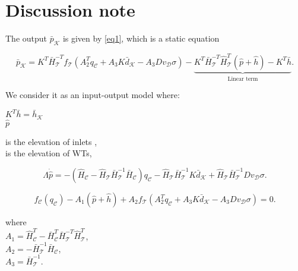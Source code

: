 


\frontmatter
{}

\section{Discussion note}

The output $\bar{p}_{\mathcal{K}}$ is given by \eqref{eq1}, which is a static equation

\begin{equation}
  \label{eq1}
  \bar{p}_{\mathcal{K}} = K^T \bar{H}^{-T}_{\mathcal{T}}f_{\mathcal{T}}(A_2^T q_\mathcal{C} + A_3 K \bar{d}_{\mathcal{K}} - A_3 D v_{\mathcal{D}} \sigma) - \underbrace{K^T\bar{H}^{-T}_{\mathcal{T}}\hat{H}^{T}_{\mathcal{T}} (\hat{p} + \hat{h}) - K^T\bar{h}}_{\text{Linear term}} .
\end{equation}

We consider it as an input-output model where:

 \begin{minipage}[t]{0.28\textwidth}
\hspace*{6mm} $K^T\bar{h} = \bar{h}_{\mathcal{K}} $ \\
\hspace*{6mm} $\hat{p}$  
\end{minipage}
\begin{minipage}[t]{0.68\textwidth}
is the elevation of inlets ,\\
is the elevation of WTs, 
\end{minipage}

\begin{equation}
\label{eq2}
\Lambda \dot{\hat{p}} = - (\hat{H}_{\mathcal{C}} - \hat{H}_{\mathcal{T}} \bar{H}^{-1}_{\mathcal{T}}\bar{H}_{\mathcal{C}})  q_\mathcal{C}  - \hat{H}_{\mathcal{T}} \bar{H}^{-1}_{\mathcal{T}} K \bar{d}_{\mathcal{K}} + \hat{H}_{\mathcal{T}} \bar{H}^{-1}_{\mathcal{T}} D v_{\mathcal{D}} \sigma .
\end{equation}

 \begin{equation}
\label{eq3}
f_{\mathcal{C}}(q_\mathcal{C}) - A_1(\hat{p} + \hat{h}) + A_2 f_{\mathcal{T}}(A_2^T q_\mathcal{C} + A_3 K \bar{d}_{\mathcal{K}} - A_3 D v_{\mathcal{D}} \sigma) = 0.
\end{equation} 

\begin{minipage}[t]{0.4\textwidth}
where\\
\hspace*{8mm} $A_1 = \hat{H}^T_{\mathcal{C}} -\bar{H}^T_{\mathcal{C}}\bar{H}^{-T}_{\mathcal{T}}\hat{H}^T_{\mathcal{T}}$, \vspace*{1.5mm}  \\
\hspace*{8mm} $A_2 = -\bar{H}^{-1}_{\mathcal{T}} \bar{H}_{\mathcal{C}} $, \vspace*{1.5mm}\\
\hspace*{8mm} $A_3 = \bar{H}^{-1}_{\mathcal{T}}$. 
\end{minipage}


